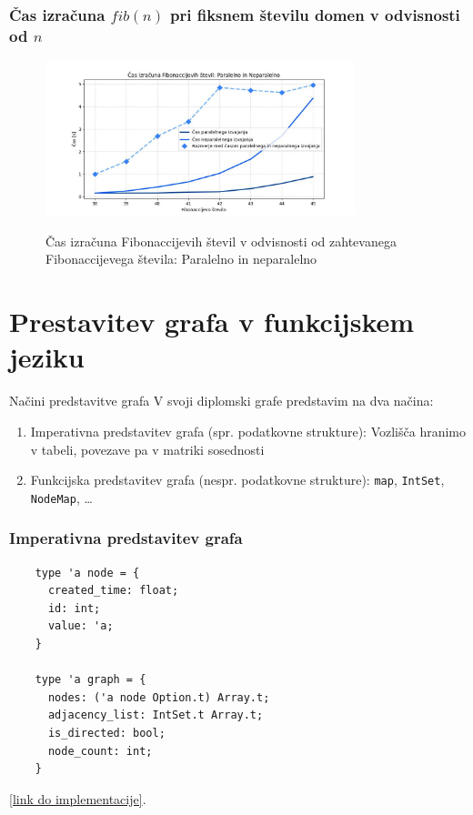 \documentclass{beamer}
\begin{document}
\begin{frame}
    \frametitle{Čas izračuna $fib(n)$ pri fiksnem številu domen v odvisnosti od $n$}
    \begin{figure}
        \centering
        \caption{Čas izračuna Fibonaccijevih števil v odvisnosti od zahtevanega Fibonaccijevega števila: Paralelno in neparalelno}
        \includegraphics[width=9cm]{slike/fib_par_v_odvisnosti_od_n.jpg}
        \label{fig:fib_par_v_odvisnosti_od_n}
      \end{figure}
\end{frame}
    
    

\section{Prestavitev grafa v funkcijskem jeziku}

\begin{frame}{Načini predstavitve grafa}
    V svoji diplomski grafe predstavim na dva načina:
    \begin{enumerate}
    \item Imperativna predstavitev grafa (spr. podatkovne strukture): Vozlišča hranimo v tabeli, povezave pa v matriki sosednosti
    \item Funkcijska predstavitev grafa (nespr. podatkovne strukture): \texttt{map}, \texttt{IntSet}, \texttt{NodeMap}, \dots
    \end{enumerate}
\end{frame}


\begin{frame}[fragile]
    \frametitle{Imperativna predstavitev grafa}
    \begin{verbatim}
    type 'a node = {
      created_time: float;
      id: int;
      value: 'a;
    }
    
    type 'a graph = {
      nodes: ('a node Option.t) Array.t;
      adjacency_list: IntSet.t Array.t;
      is_directed: bool;
      node_count: int;
    }
    \end{verbatim}
    \href{https://github.com/tjazerzen/parallelisation-of-graph-algorithms-in-functional-programming-languages/blob/predstavitev_grafa_z_arrayi_ter_mnozicami/playground/graph/graph.ml}{[link do implementacije]}.
\end{frame}
\end{document}
